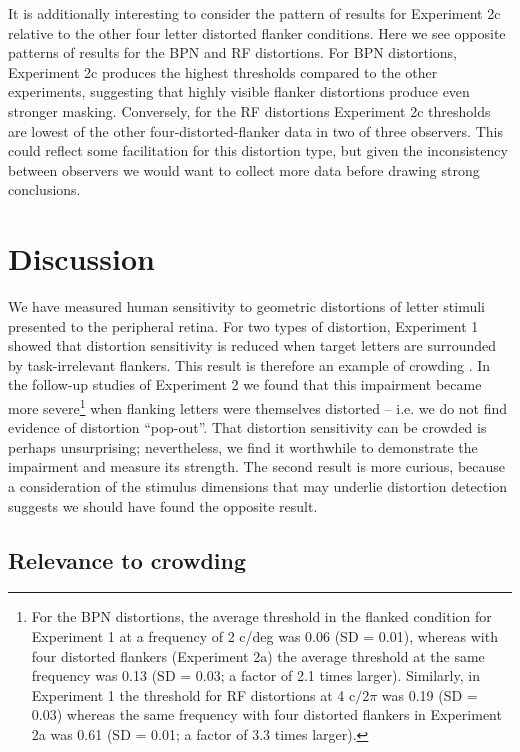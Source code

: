 \documentclass[doc, 11pt,a4paper,natbib]{apa6}\usepackage[]{graphicx}\usepackage[]{color}
\begin{document}
It is additionally interesting to consider the pattern of results for Experiment 2c relative to the other four letter distorted flanker conditions.
Here we see opposite patterns of results for the BPN and RF distortions.
For BPN distortions, Experiment 2c produces the highest thresholds compared to the other experiments, suggesting that highly visible flanker distortions produce even stronger masking.
Conversely, for the RF distortions Experiment 2c thresholds are lowest of the other four-distorted-flanker data in two of three observers.
This could reflect some facilitation for this distortion type, but given the inconsistency between observers we would want to collect more data before drawing strong conclusions.

\section{Discussion}




We have measured human sensitivity to geometric distortions of letter stimuli presented to the peripheral retina.
For two types of distortion, Experiment 1 showed that distortion sensitivity is reduced when target letters are surrounded by task-irrelevant flankers.
This result is therefore an example of crowding \citep{bouma_interaction_1970}.
In the follow-up studies of Experiment 2 we found that this impairment became more severe\footnote{
For the BPN distortions, the average threshold in the flanked condition for Experiment 1 at a frequency of 2 c/deg was
0.06 (SD = 0.01),
whereas with four distorted flankers (Experiment 2a) the average threshold at the same frequency was
0.13 (SD = 0.03;
a factor of 2.1 times larger).
Similarly, in Experiment 1 the threshold for RF distortions at 4 $\mathrm{c}/2\pi$ was
0.19 (SD = 0.03) whereas the same frequency with four distorted flankers in Experiment 2a was
0.61 (SD = 0.01;
a factor of 3.3 times larger).
} when flanking letters were themselves distorted -- i.e. we do not find evidence of distortion ``pop-out''.
That distortion sensitivity can be crowded is perhaps unsurprising; nevertheless, we find it worthwhile to demonstrate the impairment and measure its strength.
The second result is more curious, because a consideration of the stimulus dimensions that may underlie distortion detection suggests we should have found the opposite result.


\subsection{Relevance to crowding}
\end{document}
